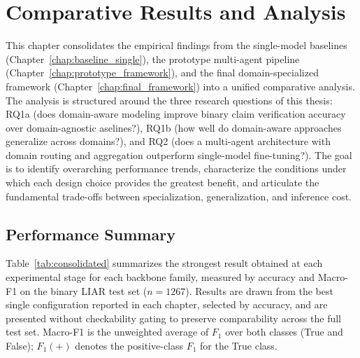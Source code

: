 \chapter{Comparative Results and Analysis}
\label{chap:comparative}

This chapter consolidates the empirical findings from the single-model baselines (Chapter~\ref{chap:baseline_single}), the prototype multi-agent pipeline (Chapter~\ref{chap:prototype_framework}), and the final domain-specialized framework (Chapter~\ref{chap:final_framework}) into a unified comparative analysis. The analysis is structured around the three research questions of this thesis: RQ1a (does domain-aware modeling improve binary claim verification accuracy over domain-agnostic aselines?), RQ1b (how well do domain-aware approaches generalize across domains?), and RQ2 (does a multi-agent architecture with domain routing and aggregation outperform single-model fine-tuning?). The goal is to identify overarching performance trends, characterize the conditions under which each design choice provides the greatest benefit, and articulate the fundamental trade-offs between specialization, generalization, and inference cost.

\section{Performance Summary}

Table~\ref{tab:consolidated} summarizes the strongest result obtained at each experimental stage for each backbone family, measured by accuracy and Macro-F1 on the binary LIAR test set ($n = 1267$). Results are drawn from the best single configuration reported in each chapter, selected by accuracy, and are presented without checkability gating to preserve comparability across the full test set. Macro-F1 is the unweighted average of $F_1$ over both classes (True and False); $F_1(+)$ denotes the positive-class $F_1$ for the True class.

